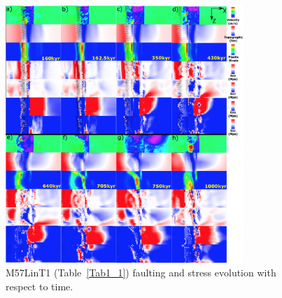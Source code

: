 \begin{figure}[h]
 \centering
  \includegraphics[width=0.8\textwidth]{./Figures/fig_Results_MRange_2_M57LinT1_time_evolution.eps}
 \caption{M57LinT1 (Table~\hyperref[Tab1_1]{\ref{Tab1_1}}) faulting and stress evolution with respect to time.}
\label{fig_Results_MRange_2}
\end{figure}
~\\
